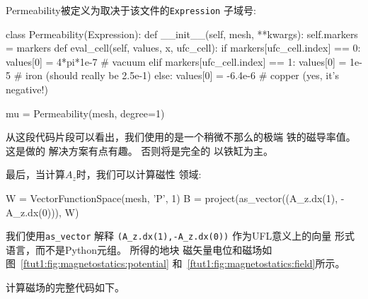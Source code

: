 Permeability被定义为取决于该文件的\texttt{Expression}
子域号:
\begin{python}
class Permeability(Expression):
    def __init__(self, mesh, **kwargs):
        self.markers = markers
    def eval_cell(self, values, x, ufc_cell):
        if markers[ufc_cell.index] == 0:
            values[0] = 4*pi*1e-7 # vacuum
        elif markers[ufc_cell.index] == 1:
            values[0] = 1e-5      # iron (should really be 2.5e-1)
        else:
            values[0] = -6.4e-6   # copper (yes, it's negative!)

mu = Permeability(mesh, degree=1)
\end{python}
从这段代码片段可以看出，我们使用的是一个稍微不那么的极端
铁的磁导率值。 这是做的
解决方案有点有趣。 否则将是完全的
以铁缸为主。

最后，当计算$A_z$时，我们可以计算磁性
领域:

\begin{python}
W = VectorFunctionSpace(mesh, 'P', 1)
B = project(as_vector((A_z.dx(1), -A_z.dx(0))), W)
\end{python}
我们使用\verb!as_vector! 解释
\verb!(A_z.dx(1),-A_z.dx(0))! 作为UFL意义上的向量
形式语言，而不是Python元组。 所得的地块
磁矢量电位和磁场如图~\ref{ftut1:fig:magnetostatics:potential}
和~\ref{ftut1:fig:magnetostatics:field}所示。



计算磁场的完整代码如下。

